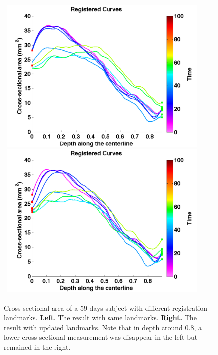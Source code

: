 \begin{figure}[tb]
  \begin{center}
    \begin{tabular}{ccc}
    \includegraphics[width=\figwidth] {fig/registered_1_updates_0.png}
    \includegraphics[width=\figwidth] {fig/registered_1_updates_1.png}
    \end{tabular}
    \caption{ \label{fig:landmark_updated} Cross-sectional area of a 59 days subject with different registration landmarks. {\bf Left.} The result with same landmarks. {\bf Right.} The result with updated landmarks. Note that in depth around 0.8, a lower cross-sectional measurement was disappear in the left but remained in the right.
    }
  \end{center}
\end{figure}

